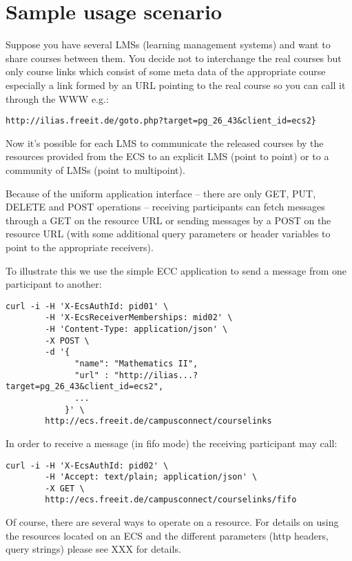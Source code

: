 \section{Sample usage scenario}

Suppose you have several LMSs (learning management systems) and want to share courses between them. You decide not
to interchange the real courses but only course links which consist of some
meta data of the appropriate course especially a link formed by an URL pointing
to the real course so you can call it through the WWW e.g.: 

\verb!http://ilias.freeit.de/goto.php?target=pg_26_43&client_id=ecs2}!

Now it's possible for each LMS to communicate the released courses by the
resources provided from the ECS to an explicit LMS (point to point) or to a
community of LMSs (point to multipoint). 

Because of the uniform application interface -- there are only GET,
PUT, DELETE and POST operations -- receiving participants can fetch
messages through a GET on the resource URL or sending messages
by a POST on the resource URL (with some additional query parameters
or header variables to point to the appropriate receivers).

To illustrate this we use the simple ECC application  to
send a message from one participant to another:

\begin{verbatim}
curl -i -H 'X-EcsAuthId: pid01' \
        -H 'X-EcsReceiverMemberships: mid02' \
        -H 'Content-Type: application/json' \
        -X POST \
        -d '{
              "name": "Mathematics II",
              "url" : "http://ilias...?target=pg_26_43&client_id=ecs2",
              ...
            }' \
        http://ecs.freeit.de/campusconnect/courselinks
\end{verbatim}
In order to receive a message (in fifo mode) the receiving
participant may call:
\begin{verbatim}
curl -i -H 'X-EcsAuthId: pid02' \
        -H 'Accept: text/plain; application/json' \
        -X GET \
        http://ecs.freeit.de/campusconnect/courselinks/fifo
\end{verbatim}

Of course, there are several ways to operate on a resource. For details
on using the resources located on an ECS and the different parameters
(http headers, query strings) please see XXX for details.

